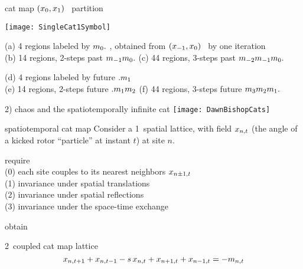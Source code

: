 \begin{frame}{cat map $(x_{0},x_{1})$  \statesp\ partition}
\begin{center}
	\texttt{[image: SingleCat1Symbol]}
\end{center}

{\scriptsize
(a) 4 regions labeled by ${m_{0}}.$ , obtained from
$(x_{-1},x_{0})$ \statesp\ by one iteration
\\
(b) 14 regions, 2-steps past ${m_{-1}}{m_{0}}.$
(c) 44 regions, 3-steps past ${m_{-2}}{m_{-1}}{m_{0}}.$

\medskip

(d) 4 regions labeled by future $.{m_{1}}$
\\
(e) 14 regions, 2-steps  future $.{m_{1}}{m_{2}}$
(f) 44 regions, 3-steps future {\brick} ${m_{3}}{m_{2}}{m_{1}}.$
}
\end{frame}

\begin{frame}{2) chaos and the spatiotemporally infinite cat}
\hfill\texttt{[image: DawnBishopCats]}
\end{frame}


\begin{frame}{spatiotemporal cat map}
Consider
a 1\dmn\ spatial lattice, with field $x_{n,t}$  (the angle of a kicked
rotor ``particle'' at instant $t$)  at site $n$.

\bigskip

require
\\
(0) each site couples to
its nearest neighbors $x_{n\pm1,t}$
\\(1) invariance under
spatial translations
\\(2) invariance under spatial reflections
\\(3) invariance under the space-time exchange

\bigskip

obtain
\begin{block}{2\dmn\ coupled cat map lattice}
\[
x_{n,t+1} + x_{n,t-1} - s \, x_{n,t} + x_{n+1,t} + x_{n-1, t}
     =-{m_{n,t}}
\] %
\end{block}
\end{frame}

